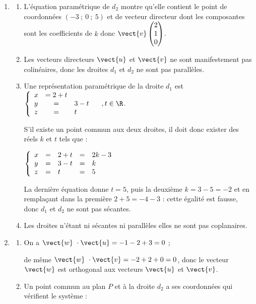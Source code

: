 \medskip

\begin{enumerate}
\item 
	\begin{enumerate}
		\item L'équation paramétrique de $d_2$ montre qu'elle contient le point de coordonnées $(-3~;~0~;~5)$ et de vecteur directeur dont les composantes sont les coefficients de $k$ donc $\vect{v}\begin{pmatrix}2\\1\\0\end{pmatrix}$.
		\item Les vecteurs directeurs $\vect{u}$ et $\vect{v}$ ne sont manifestement pas colinéaires, donc les droites $d_1$ et $d_2$ ne sont pas parallèles.
		\item Une représentation paramétrique de la droite $d_1$ est $\left\{\begin{array}{l c l}
x&=2 + t\\
y&=&3 - t\\
z&=&t
\end{array}\right. \quad , t \in \R$.

S'il existe un point commun aux deux droites, il doit donc exister des réels $k$ et $t$ tels que :

$\left\{\begin{array}{l c l c l}
x &=& 2 + t&=&2k - 3\\
y&=&3 - t&=&k\\
z&=&t&=&5
\end{array}\right.$

La dernière équation donne $t = 5$, puis la deuxième $k = 3 - 5 = - 2$ et en remplaçant dans la première $2 + 5 = - 4 - 3$ : cette égalité est fausse, donc $d_1$ et $d_2$  ne sont pas sécantes.
		\item Les droites n'étant ni sécantes ni parallèles elles ne sont pas coplanaires.
	\end{enumerate}
\item 
	\begin{enumerate}
		\item On a $\vect{w}\ \cdot \vect{u} = - 1 - 2 + 3 = 0$ ;
		
		de même $\vect{w}\ \cdot \vect{v} = - 2 + 2 + 0 = 0$, donc le vecteur $\vect{w}$ est orthogonal aux vecteurs $\vect{u}$ et $\vect{v}$.
		\item Un point commun au plan $P$ et à la droite $d_2$ a ses coordonnées qui vérifient le système :
		

\end{enumerate}
\end{enumerate}
